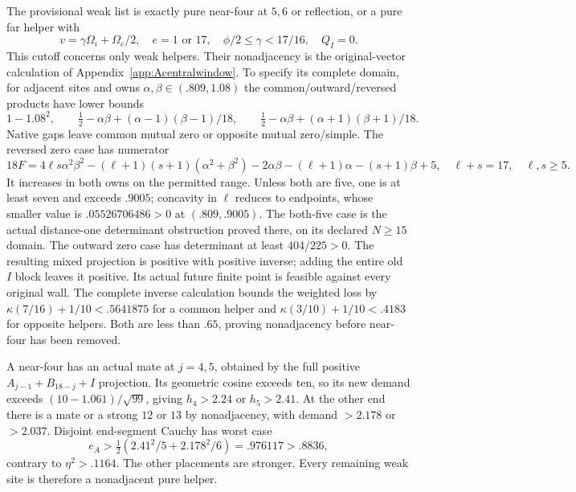 The provisional weak list is exactly pure near-four at \(5,6\)
or reflection, or a pure far helper with
\[
 v=\gamma\Omega_i+\Omega_e/2,\quad e=1\text{ or }17,\quad
 \phi/2\leq\gamma<17/16,\quad Q_I=0 .
\]
This cutoff concerns only weak helpers.
Their nonadjacency is the original-vector calculation of
Appendix~\ref{app:Acentralwindow}. To specify its complete domain,
for adjacent sites and owns \(\alpha,\beta\in(.809,1.08)\)
the common/outward/reversed products have lower bounds
\[
 1-1.08^2,\qquad
 \tfrac12-\alpha\beta+(\alpha-1)(\beta-1)/18,\qquad
 \tfrac12-\alpha\beta+(\alpha+1)(\beta+1)/18 .
\]
Native gaps leave common mutual zero or opposite mutual zero/simple.
The reversed zero case has numerator
\[
 18F=4\ell s\alpha^2\beta^2-(\ell+1)(s+1)(\alpha^2+\beta^2)
       -2\alpha\beta-(\ell+1)\alpha-(s+1)\beta+5,
 \quad \ell+s=17,\quad\ell,s\geq5 .
\]
It increases in both owns on the permitted range. Unless both are
five, one is at least seven and exceeds \(.9005\);
concavity in \(\ell\) reduces to endpoints, whose smaller value is
\(.05526706486>0\) at \((.809,.9005)\).
The both-five case is the actual distance-one determinant obstruction
proved there, on its declared \(N\geq15\) domain.
The outward zero case has determinant at least \(404/225>0\).
The resulting mixed projection is positive with positive inverse;
adding the entire old \(I\) block leaves it positive.
Its actual future finite point is feasible against every original wall.
The complete inverse calculation bounds the weighted loss by
\(\kappa(7/16)+1/10<.5641875\) for a common helper and
\(\kappa(3/10)+1/10<.4183\) for opposite helpers.
Both are less than \(.65\), proving nonadjacency before near-four
has been removed.

A near-four has an actual mate at \(j=4,5\), obtained by the full
positive \(A_{j-1}+B_{18-j}+I\) projection.
Its geometric cosine exceeds ten, so its new demand exceeds
\((10-1.061)/\sqrt{99}\), giving \(h_4>2.24\) or \(h_5>2.41\).
At the other end there is a mate or a strong \(12\) or \(13\)
by nonadjacency, with demand \(>2.178\) or \(>2.037\).
Disjoint end-segment Cauchy has worst case
\[
 e_A>\tfrac12(2.41^2/5+2.178^2/6)=.976117>.8836,
\]
contrary to \(\eta^2>.1164\). The other placements are stronger.
Every remaining weak site is therefore a nonadjacent pure helper.

